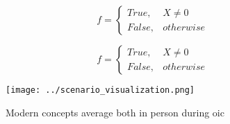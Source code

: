 \documentclass[a4paper]{article}
\begin{document}
\begin{equation}   f =
\begin{cases} True, & X \neq 0\\
False, & otherwise
\end{cases}
\end{equation}

\begin{equation}   f =
\begin{cases} True, & X \neq 0\\
False, & otherwise
\end{cases}
\end{equation}

\begin{figure}
\centering
\texttt{[image: ../scenario\_visualization.png]}
\caption{Modern concepts average both in person during oic
}
\end{figure}
 
\end{document}
